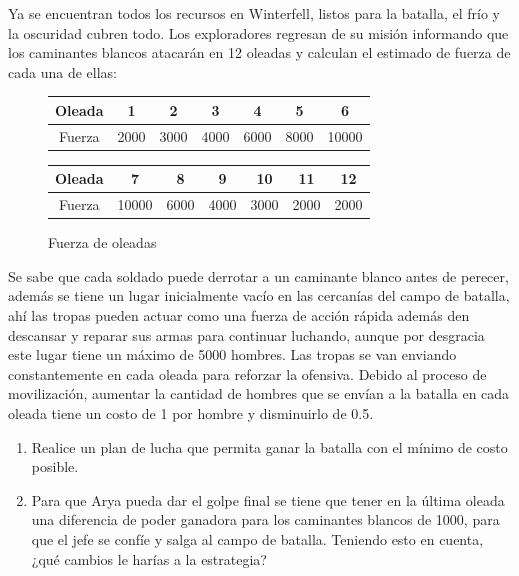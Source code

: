 \documentclass[a4paper,10pt,twocolumn]{article}
\theoremstyle{theorem}
\theoremstyle{definition}
\theoremstyle{remark}
\begin{document}
Ya se encuentran todos los recursos en Winterfell, listos para la batalla, el frío y la oscuridad cubren todo. Los exploradores regresan de su misión informando que los caminantes blancos atacarán en 12 oleadas y calculan el estimado de fuerza de cada una de ellas:

\begin{figure}[h!]%
	\begin{center}
		\begin{tabular}{|c|c|c|c|c|c|c|} \hline
		Oleada	& 1		& 2		& 3	    & 4		& 5		& 6		\\ \hline
		Fuerza	& 2000	& 3000	& 4000	& 6000	& 8000	& 10000	\\ \hline
		\end{tabular}
		
		\begin{tabular}{|c|c|c|c|c|c|c|} \hline
		Oleada	& 7		& 8		& 9	    & 10	& 11	& 12	\\ \hline
		Fuerza	& 10000	& 6000	& 4000	& 3000	& 2000	& 2000	\\ \hline
		\end{tabular}
	\caption{Fuerza de oleadas}\label{fig:ejer_5_1}
	\end{center}
\end{figure}

Se sabe que cada soldado puede derrotar a un caminante blanco antes de perecer, además se tiene un lugar inicialmente vacío en las cercanías del campo de batalla, ahí las tropas pueden actuar como una fuerza de acción rápida además den descansar y reparar sus armas para continuar luchando, aunque por desgracia este lugar tiene un máximo de 5000 hombres. Las tropas se van enviando constantemente en cada oleada para reforzar la ofensiva. Debido al proceso de movilización, aumentar la cantidad de hombres que se envían a la batalla en cada oleada tiene un costo de 1 por hombre y disminuirlo de 0.5.

\renewcommand{\theenumi}{\alph{enumi}} %

\begin{enumerate}

	\item Realice un plan de lucha que permita ganar la batalla con el mínimo de costo posible.
	\item Para que Arya pueda dar el golpe final se tiene que tener en la última oleada una diferencia de poder ganadora para los caminantes 
	blancos de 1000, para que el jefe se confíe y salga al campo de batalla. Teniendo esto en cuenta, ¿qué cambios le harías a la estrategia?

\end{enumerate}
\end{document}
